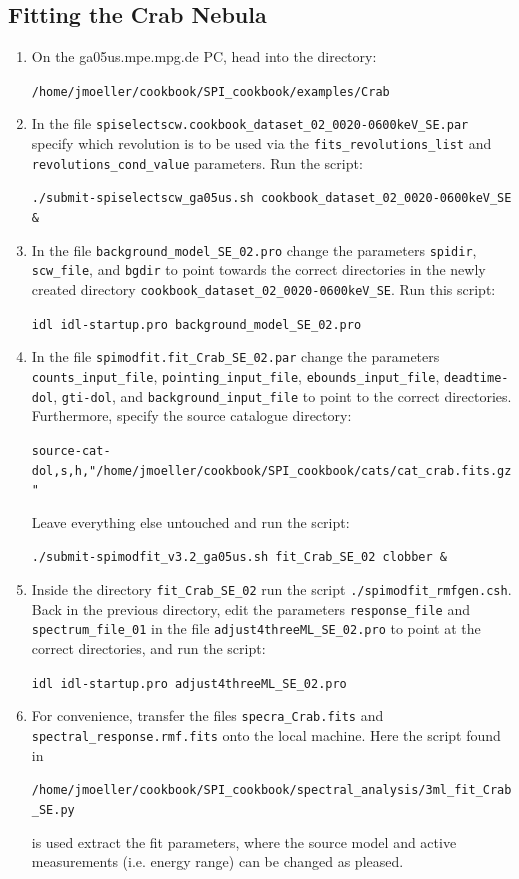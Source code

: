 \documentclass{article}
\begin{document}
\subsection{Fitting the Crab Nebula} \label{Spimodfit crab steps}

\begin{enumerate}
    \item On the ga05us.mpe.mpg.de PC, head into the directory:
    
    \verb|/home/jmoeller/cookbook/SPI_cookbook/examples/Crab|

    \item \label{scw select} In the file \verb|spiselectscw.cookbook_dataset_02_0020-0600keV_SE.par| specify which revolution is to be used via the \verb|fits_revolutions_list| and \verb|revolutions_cond_value| parameters. Run the script:
    
    \verb|./submit-spiselectscw_ga05us.sh cookbook_dataset_02_0020-0600keV_SE &|

    \item \label{step background} In the file \verb|background_model_SE_02.pro| change the parameters \verb|spidir|, \verb|scw_file|, and \verb|bgdir| to point towards the correct directories in the newly created directory \verb|cookbook_dataset_02_0020-0600keV_SE|. Run this script: 
    
    \verb|idl idl-startup.pro background_model_SE_02.pro|

    \item \label{Source directory} In the file \verb|spimodfit.fit_Crab_SE_02.par| change the parameters \verb|counts_input_file|, \verb|pointing_input_file|, \verb|ebounds_input_file|, \verb|deadtime-dol|, \verb|gti-dol|, and \verb|background_input_file| to point to the correct directories. Furthermore, specify the source catalogue directory:
    
    \verb|source-cat-dol,s,h,"/home/jmoeller/cookbook/SPI_cookbook/cats/cat_crab.fits.gz"|

    Leave everything else untouched and run the script:

    \verb|./submit-spimodfit_v3.2_ga05us.sh fit_Crab_SE_02 clobber &|

    \item \label{Spectrum file} Inside the directory \verb|fit_Crab_SE_02| run the script \verb|./spimodfit_rmfgen.csh|. Back in the previous directory, edit the parameters \verb|response_file| and \verb|spectrum_file_01| in the file \verb|adjust4threeML_SE_02.pro| to point at the correct directories, and run the script:
    
    \verb|idl idl-startup.pro adjust4threeML_SE_02.pro|

    \item For convenience, transfer the files \verb|specra_Crab.fits| and \verb|spectral_response.rmf.fits| onto the local machine. Here the script found in
    
    \verb|/home/jmoeller/cookbook/SPI_cookbook/spectral_analysis/3ml_fit_Crab_SE.py|
    
    is used extract the fit parameters, where the source model and active measurements (i.e. energy range) can be changed as pleased.
\end{enumerate}
\end{document}
